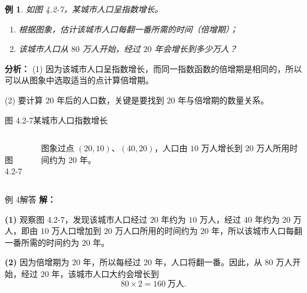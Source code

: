 \documentclass[aspectratio=169,11pt,t,fleqn]{ctexbeamer}
\newtheorem{instance}{例}%
\begin{document}
\begin{frame}{}
  \begin{instance}
    如图 4.2-7，某城市人口呈指数增长。
    \begin{enumerate}[(\arabic*)]
      \item 根据图象，估计该城市人口每翻一番所需的时间（倍增期）；
      \item 该城市人口从 $80$ 万人开始，经过 $20$ 年会增长到多少万人？
    \end{enumerate}
  \end{instance}

  \vspace{0.3em}
  \small\textbf{分析：}
  (1) 因为该城市人口呈指数增长，而同一指数函数的倍增期是相同的，所以可以从图象中选取适当的点计算倍增期。

  (2) 要计算 $20$ 年后的人口数，关键是要找到 $20$ 年与倍增期的数量关系。
\end{frame}

\begin{frame}{图 4.2-7\quad 某城市人口指数增长}
  \begin{columns}
    \centering
    \\[2pt]
    图 4.2-7

    \small
    图象过点 $(20,10)$、$(40,20)$，人口由 $10$ 万人增长到 $20$ 万人所用时间约为 $20$ 年。
  \end{columns}
\end{frame}

\begin{frame}{例 4\quad 解答}
  \small
  \textbf{解：}

  \textbf{(1)} 观察图 4.2-7，发现该城市人口经过 $20$ 年约为 $10$ 万人，经过 $40$ 年约为 $20$ 万人，即由 $10$ 万人口增加到 $20$ 万人口所用的时间约为 $20$ 年，所以该城市人口每翻一番所需的时间约为 \alert{$20$ 年}。

  \vspace{0.8em}
  \textbf{(2)} 因为倍增期为 $20$ 年，所以每经过 $20$ 年，人口将翻一番。因此，从 $80$ 万人开始，经过 $20$ 年，该城市人口大约会增长到
  \[
    80\times 2=160\ \text{万人}.
  \]
\end{frame}
\end{document}
